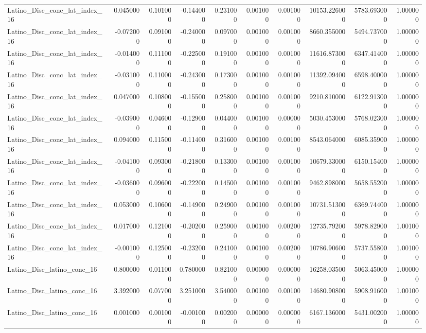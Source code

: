 \begin{table}
\begin{tabular}{lrrrrrrrrr}
Latino_Disc_conc_lat_index_16 & 0.045000 & 0.101000 & -0.144000 & 0.231000 & 0.001000 & 0.001000 & 10153.226000 & 5783.693000 & 1.000000 \\
Latino_Disc_conc_lat_index_16 & -0.072000 & 0.091000 & -0.240000 & 0.097000 & 0.001000 & 0.001000 & 8660.355000 & 5494.737000 & 1.000000 \\
Latino_Disc_conc_lat_index_16 & -0.014000 & 0.111000 & -0.225000 & 0.191000 & 0.001000 & 0.001000 & 11616.873000 & 6347.414000 & 1.000000 \\
Latino_Disc_conc_lat_index_16 & -0.031000 & 0.110000 & -0.243000 & 0.173000 & 0.001000 & 0.001000 & 11392.094000 & 6598.400000 & 1.000000 \\
Latino_Disc_conc_lat_index_16 & 0.047000 & 0.108000 & -0.155000 & 0.258000 & 0.001000 & 0.001000 & 9210.810000 & 6122.913000 & 1.000000 \\
Latino_Disc_conc_lat_index_16 & -0.039000 & 0.046000 & -0.129000 & 0.044000 & 0.001000 & 0.000000 & 5030.453000 & 5768.023000 & 1.000000 \\
Latino_Disc_conc_lat_index_16 & 0.094000 & 0.115000 & -0.114000 & 0.316000 & 0.001000 & 0.001000 & 8543.064000 & 6085.359000 & 1.000000 \\
Latino_Disc_conc_lat_index_16 & -0.041000 & 0.093000 & -0.218000 & 0.133000 & 0.001000 & 0.001000 & 10679.330000 & 6150.154000 & 1.000000 \\
Latino_Disc_conc_lat_index_16 & -0.036000 & 0.096000 & -0.222000 & 0.145000 & 0.001000 & 0.001000 & 9462.898000 & 5658.552000 & 1.000000 \\
Latino_Disc_conc_lat_index_16 & 0.053000 & 0.106000 & -0.149000 & 0.249000 & 0.001000 & 0.001000 & 10731.513000 & 6369.744000 & 1.000000 \\
Latino_Disc_conc_lat_index_16 & 0.017000 & 0.121000 & -0.202000 & 0.259000 & 0.001000 & 0.002000 & 12735.792000 & 5978.829000 & 1.001000 \\
Latino_Disc_conc_lat_index_16 & -0.001000 & 0.125000 & -0.232000 & 0.241000 & 0.001000 & 0.002000 & 10786.906000 & 5737.558000 & 1.001000 \\
Latino_Disc_latino_conc_16 & 0.800000 & 0.011000 & 0.780000 & 0.821000 & 0.000000 & 0.000000 & 16258.035000 & 5063.450000 & 1.000000 \\
Latino_Disc_latino_conc_16 & 3.392000 & 0.077000 & 3.251000 & 3.540000 & 0.001000 & 0.001000 & 14680.908000 & 5908.916000 & 1.001000 \\
Latino_Disc_latino_conc_16 & 0.001000 & 0.001000 & -0.001000 & 0.002000 & 0.000000 & 0.000000 & 6167.136000 & 5431.002000 & 1.000000 \\

\end{tabular}
\end{table}

